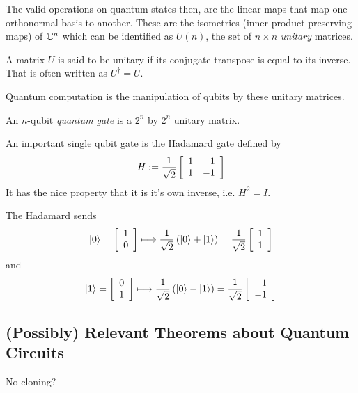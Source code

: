         The valid operations on quantum states then, are the linear maps that map one orthonormal basis to another.  
        These are the isometries (inner-product preserving maps) of $\mathbb{C}^n$ which can be identified as $U(n)$, the 
        set of $n \times n$ \emph{unitary} matrices.

        \begin{definition}
            A matrix $U$ is said to be unitary if its conjugate transpose is equal to its inverse. That is often 
            written as $U^\dagger = U$.
        \end{definition}
        
        Quantum computation is the manipulation of qubits by these unitary matrices.

        \begin{definition}
            An $n$-qubit \emph{quantum gate} is a $2^n$ by $2^n$ unitary matrix.
        \end{definition}
        

        \begin{example}
            An important single qubit gate is the Hadamard gate defined by 
            \[
                H := \frac{1}{\sqrt{2}} \left[\begin{array}{rr}1&1\\1&-1\end{array}\right]
            \]
            It has the nice property that it is it's own inverse, i.e. $H^2 = I$.

            The Hadamard sends
            \[
                \ket{0} = \left[\begin{array}{r}1\\0\end{array}\right]  \longmapsto \frac{1}{\sqrt{2}}\left(\ket{0} + \ket{1}\right)  = 
                \frac{1}{\sqrt{2}} \left[\begin{array}{r}1\\1\end{array}\right]
            \]
            and
            \[
                \ket{1} = \left[\begin{array}{r}0\\1\end{array}\right] \longmapsto \frac{1}{\sqrt{2}}\left( \ket{0} - \ket{1} \right) = 
                \frac{1}{\sqrt{2}} \left[\begin{array}{r}1\\-1\end{array}\right]
            \]

        \end{example}
        


        
        \subsection{(Possibly) Relevant Theorems about Quantum Circuits}

        \begin{theorem}
            No cloning? 
        \end{theorem}

